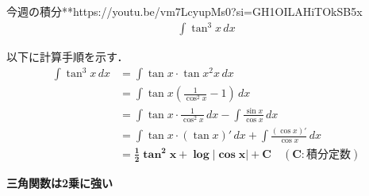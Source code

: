 \documentclass[main]{subfiles}
\begin{document}

\begin{mondai}{1}{今週の積分}{**}{https://youtu.be/vm7LcyupMs0?si=GH1OILAHiTOkSB5x}
    \begin{align*}
        \int \tan^3 x \, dx
    \end{align*}
\end{mondai}


\solutionhead
\hfill
以下に計算手順を示す．
\hfill\ 
\begin{align*}
    \int \tan ^3 x \, dx   
        &= \int \tan x \cdot \tan x ^2 x \, dx \\
        &= \int \tan x \left( \frac{1}{\cos ^2 x} -1 \right)  \, dx \\
        &= \int \tan x \cdot \frac{1}{\cos ^2 x} \, dx - \int \frac{\sin x}{\cos x} \, dx \\
        &= \int \tan x \cdot \left(\tan x\right)' \, dx + \int \frac{\left(\cos x\right)'}{\cos x} \, dx \\
        &= \boldsymbol{\frac{1}{2} \tan ^2 x + \log \left| \cos x \right| + C \quad (C:\textbf{積分定数})}
\end{align*}

\begin{focusbox}
\centering
\textbf{三角関数は2乗に強い}
\end{focusbox}
\end{document}
